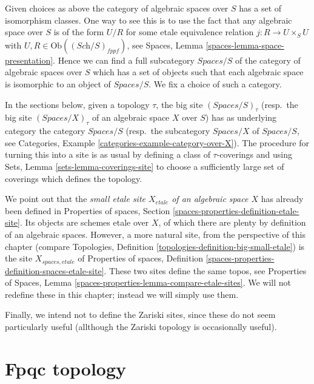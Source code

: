 \medskip\noindent
Given choices as above the category of algebraic spaces over $S$
has a set of isomorphism classes. One way to see this is to use the
fact that any algebraic space over $S$ is of the form $U/R$ for
some etale equivalence relation $j : R \to U \times_S U$ with
$U, R \in \text{Ob}((\textit{Sch}/S)_{fppf})$, see
Spaces, Lemma \ref{spaces-lemma-space-presentation}.
Hence we can find a full subcategory $\textit{Spaces}/S$ of the category of
algebraic spaces over $S$ which has a set of objects
such that each algebraic space is isomorphic to an object of
$\textit{Spaces}/S$. We fix a choice of such a category.

\medskip\noindent
In the sections below, given a topology $\tau$, the big site
$(\textit{Spaces}/S)_\tau$ (resp.\ the big site $(\textit{Spaces}/X)_\tau$
of an algebraic space $X$ over $S$)
has as underlying category the category $\textit{Spaces}/S$
(resp.\ the subcategory $\textit{Spaces}/X$ of $\textit{Spaces}/S$, see
Categories, Example \ref{categories-example-category-over-X}).
The procedure for turning this into a site is as usual by defining a
class of $\tau$-coverings and using
Sets, Lemma \ref{sets-lemma-coverings-site}
to choose a sufficiently large set of coverings which defines the topology.

\medskip\noindent
We point out that the {\it small etale site $X_{etale}$
of an algebraic space $X$} has already been defined in
Properties of spaces, Section \ref{spaces-properties-definition-etale-site}.
Its objects are schemes etale over $X$, of which there are plenty
by definition of an algebraic spaces. However,
a more natural site, from the perspective of this chapter (compare
Topologies, Definition \ref{topologies-definition-big-small-etale})
is the site $X_{spaces, etale}$ of 
Properties of spaces,
Definition \ref{spaces-properties-definition-spaces-etale-site}.
These two sites define the same topos, see
Properties of Spaces, Lemma \ref{spaces-properties-lemma-compare-etale-sites}.
We will not redefine these in this chapter; instead we will simply
use them.

\medskip\noindent
Finally, we intend not to define the Zariski sites, since these do not
seem particularly useful (allthough the Zariski topology
is occasionally useful).




\section{Fpqc topology}
\label{section-fpqc}

